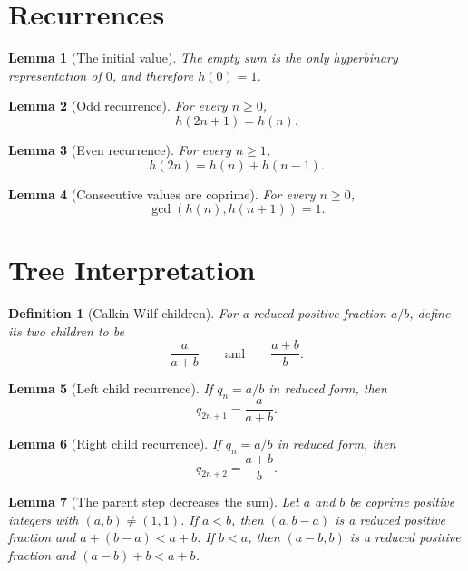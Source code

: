 \documentclass{article}
\newtheorem{definition}{Definition}
\newtheorem{lemma}{Lemma}
\begin{document}
\section{Recurrences}

\begin{lemma}[The initial value]\label{lem:hyperbinary_zero}
The empty sum is the only hyperbinary representation of $0$, and therefore
$h(0)=1$.
\end{lemma}

\begin{lemma}[Odd recurrence]\label{lem:hyperbinary_odd}
For every $n\ge 0$,
\[
  h(2n+1)=h(n).
\]
\end{lemma}

\begin{lemma}[Even recurrence]\label{lem:hyperbinary_even}
For every $n\ge 1$,
\[
  h(2n)=h(n)+h(n-1).
\]
\end{lemma}

\begin{lemma}[Consecutive values are coprime]\label{lem:consecutive_coprime}
For every $n\ge 0$,
\[
  \gcd(h(n),h(n+1))=1.
\]
\end{lemma}

\section{Tree Interpretation}

\begin{definition}[Calkin-Wilf children]\label{def:calkin_wilf_children}
For a reduced positive fraction $a/b$, define its two children to be
\[
  \frac{a}{a+b}
  \qquad\text{and}\qquad
  \frac{a+b}{b}.
\]
\end{definition}

\begin{lemma}[Left child recurrence]\label{lem:left_child_recurrence}
If $q_n=a/b$ in reduced form, then
\[
  q_{2n+1}=\frac{a}{a+b}.
\]
\end{lemma}

\begin{lemma}[Right child recurrence]\label{lem:right_child_recurrence}
If $q_n=a/b$ in reduced form, then
\[
  q_{2n+2}=\frac{a+b}{b}.
\]
\end{lemma}

\begin{lemma}[The parent step decreases the sum]\label{lem:parent_step_decreases}
Let $a$ and $b$ be coprime positive integers with $(a,b)\ne(1,1)$.  If
$a<b$, then $(a,b-a)$ is a reduced positive fraction and $a+(b-a)<a+b$.
If $b<a$, then $(a-b,b)$ is a reduced positive fraction and $(a-b)+b<a+b$.
\end{lemma}
\end{document}
